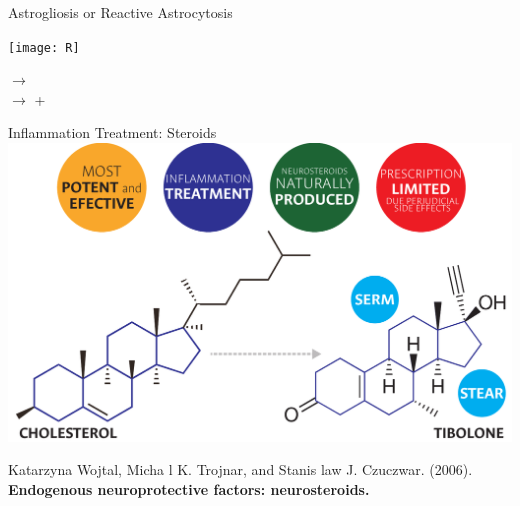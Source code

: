 \documentclass[11pt]{beamer}
\begin{document}
\begin{frame}{Astrogliosis or Reactive Astrocytosis}
\begin{center}
\texttt{[image: R]}\\
\end{center}
\begin{center}
 $\rightarrow$
 \pause\\
 $\rightarrow$
 + 
 \pause\\
\end{center}
\end{frame}
\begin{frame}{Inflammation Treatment: Steroids}
\includegraphics[width=\textwidth]{Steroids}
\begin{center}
{\scriptsize Katarzyna Wojtal, Micha l K. Trojnar, and Stanis law J. Czuczwar. (2006). \textbf{Endogenous neuroprotective factors: neurosteroids.}\\}
\end{center}
\end{frame}
\end{document}
